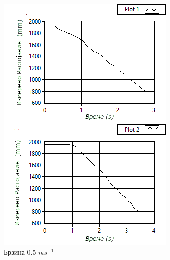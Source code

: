 \documentclass[11pt]{article}
\begin{document}
\begin{figure}[H]
\begin{minipage}{0.45\linewidth}
          \centering
          \includegraphics[width = \textwidth]{./images/speed_composite_05_mk.png}
          \caption{Брзина 0.5 $ms^{-1}$}
        \end{minipage}
        \begin{minipage}{0.45\linewidth}
          \centering

\end{minipage}
\end{figure}
\end{document}
